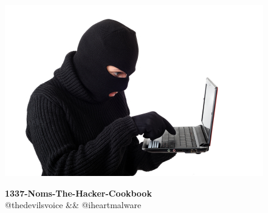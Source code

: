 
\begin{titlepage}
	\centering
	\vspace{0mm}
	\includegraphics[scale=3.5]{images/hacked.jpg}
	\vspace*{40mm} %
	\begin{flushright}
		\textbf{\Huge {1337-Noms-The-Hacker-Cookbook}}\\
		\vspace{5mm}
		\Large \textsf{@thedevilsvoice \&\& @iheartmalware}\\
		\vspace*{0mm}
	\end{flushright}
	\clearpage
	\vspace*{\fill}
\end{titlepage}